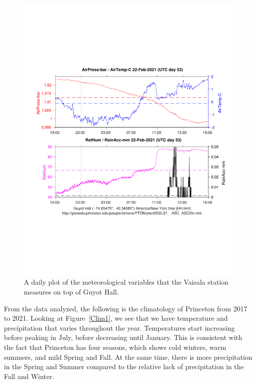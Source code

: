 \documentclass[11pt]{report}
\begin{document}
\begin{figure}[thb]
\centering \includegraphics[trim = 0.5cm 5.0cm 0.5cm 6.0cm,clip,width=1.0\textwidth]
{Figures/guyotweather_ywt_feb_22_2021.pdf}
\caption[Weather Station Data]{\label{daily}A daily plot of the
  meteorological variables that the Vaisala station measures on top
  of Guyot Hall.}
\end{figure}


From the data analyzed, the following is the climatology of Princeton from
2017 to 2021. Looking at Figure~\ref{Clim1}, we see that we have temperature
and precipitation that varies throughout the year. Temperatures start
increasing before peaking in July, before decreasing until January. This is
consistent with the fact that Princeton has four seasons, which shows cold
winters, warm summers, and mild Spring and Fall. At the same time, there is
more precipitation in the Spring and Summer compared to the relative lack of
precipitation in the Fall and Winter.
\end{document}
